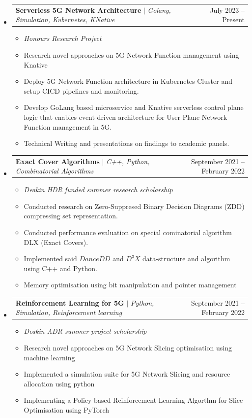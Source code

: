 \documentclass[letterpaper,11pt]{article}
\makeatletter
\newcommand{\resumeItem}[1]{
  \item\small{
    {#1 \vspace{-2pt}}
  }
}
\newcommand{\resumeProjectHeading}[2]{
    \item
    \begin{tabular*}{0.97\textwidth}{l@{\extracolsep{\fill}}r}
      \small#1 & #2 \\
    \end{tabular*}\vspace{-7pt}
}
\newcommand{\resumeSubHeadingListStart}{\begin{itemize}[leftmargin=0.15in, label={}]}
\newcommand{\resumeSubHeadingListEnd}{\end{itemize}}
\newcommand{\resumeItemListStart}{\begin{itemize}}
\newcommand{\resumeItemListEnd}{\end{itemize}\vspace{-5pt}}
\makeatother
\begin{document}
\resumeSubHeadingListStart

  \resumeProjectHeading
    {\textbf{Serverless 5G Network Architecture} $|$ \emph{Golang, Simulation, Kubernetes, KNative}}{July 2023 -- Present}
    \resumeItemListStart
      \resumeItem{\textit{Honours Research Project}}
      \resumeItem{Research novel approaches on 5G Network Function management using Knative}
      \resumeItem{Deploy 5G Network Function architecture in Kubernetes Cluster and setup CICD pipelines and monitoring.}
      \resumeItem{Develop GoLang based microservice and Knative serverless control plane logic that enables event driven architecture for User Plane Network Function management in 5G.}
      \resumeItem{Technical Writing and presentations on findings to academic panels.}
      \resumeItemListEnd

  \resumeProjectHeading
      {\textbf{Exact Cover Algorithms} 
      $|$ \emph{C++, Python, Combinatorial Algorithms}}{September 2021 -- February 2022}
      \resumeItemListStart
        \resumeItem{\textit{Deakin HDR funded summer research scholarship}}
        \resumeItem{Conducted research on Zero-Suppresed Binary Decision Diagrams (ZDD) compressing set representation.}
        \resumeItem{Conducted performance evaluation on special cominatorial algorithm DLX (Exact Covers).}
        \resumeItem{Implemented said $DanceDD$ and $D^{3}X$ data-structure and algorithm using C++ and Python.}
        \resumeItem{Memory optimisation using bit manipulation and pointer management}
      \resumeItemListEnd

  \resumeProjectHeading
      {\textbf{Reinforcement Learning for 5G} $|$ \emph{Python, Simulation, Reinforcement learning}}{September 2021 -- February 2022}
      \resumeItemListStart
        \resumeItem{\textit{Deakin ADR summer project scholarship}}
        \resumeItem{Research novel approaches on 5G Network Slicing optimisation using machine learning}
        \resumeItem{Implemented a simulation suite for 5G Network Slicing and resource allocation using python}
        \resumeItem{Implementing a Policy based Reinforcement Learning Algorthm for Slice Optimisation using PyTorch}
        \resumeItemListEnd


\resumeSubHeadingListEnd

%
\end{document}
